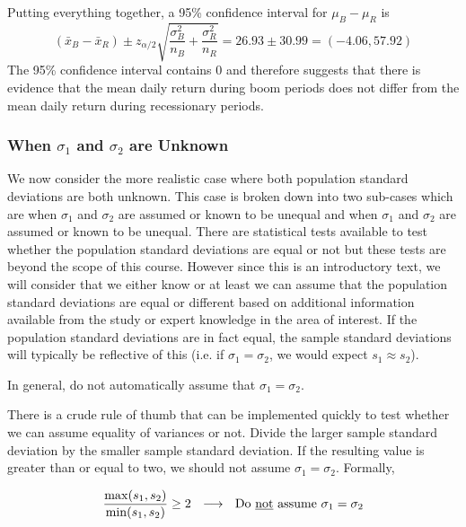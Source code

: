\begin{example}
Putting everything together, a 95\% confidence interval for $\mu_B-\mu_R$ is
\[
(\bar{x}_B - \bar{x}_R) \pm z_{\alpha/2} \sqrt{\frac{\sigma_B^2}{n_B}+\frac{\sigma_R^{2}}{n_R}} = 26.93 \pm 30.99 = (-4.06,57.92)
\]
The 95\% confidence interval contains 0 and therefore suggests that there is evidence that the mean daily return during boom periods does not differ from the mean daily return during recessionary periods. 
\end{example}









\subsubsection{When $\sigma_{1}$ and $\sigma_{2}$ are Unknown} 

We now consider the more realistic case where both population standard deviations are both unknown. This case is broken down into two sub-cases which are when $\sigma_{1}$ and $\sigma_{2}$ are assumed or known to be unequal and when $\sigma_{1}$ and $\sigma_{2}$ are assumed or known to be unequal. There are statistical tests available to test whether the population standard deviations are equal or not but these tests are beyond the scope of this course. 
However since this is an introductory text, we will consider that we either know or at least we can assume that the population standard deviations are equal or different based on additional information
available from the study or expert knowledge in the area of interest. If the population standard deviations are in fact equal, the sample standard deviations will typically be reflective of this (i.e. if $\sigma_{1} = \sigma_{2}$, we would expect $s_{1} \approx s_{2}$).

\begin{nt}
In general, do not automatically assume that $\sigma_{1} = \sigma_{2}$.
\end{nt}


\begin{rules}
There is a crude rule of thumb that can be implemented
quickly to test whether we can assume equality of variances or not.
Divide the larger sample standard deviation by the smaller sample standard deviation. If the resulting value is greater than or equal to two, we should not assume $\sigma_{1}  = \sigma_{2}$. Formally,

\begin{equation}
\frac{ \max(s_{1}, s_{2}) }{ \min(s_{1}, s_{2}) } \geq 2	
~~ \longrightarrow ~~ \text{Do \underline{not} assume }  \sigma_{1}  = \sigma_{2}
\end{equation}
\end{rules}

